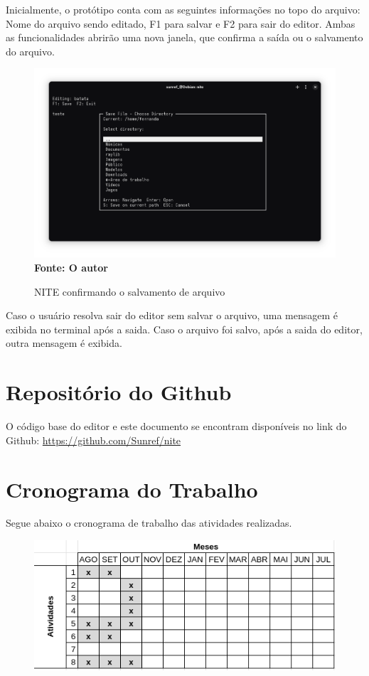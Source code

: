 Inicialmente, o protótipo conta com as seguintes informações no topo do arquivo: Nome do arquivo sendo editado, F1 para salvar e F2 para sair
do editor. Ambas as funcionalidades abrirão uma nova janela, que confirma a saída ou o salvamento do arquivo.

\FloatBarrier
\begin{figure}[!htbp]
    \centering
    \caption{NITE confirmando o salvamento de arquivo}
    \includegraphics[scale=0.3]{imagens/ConfirmSave.png}
    \\\textbf{Fonte: O autor} \label{fig:ConfirmSave}
\end{figure}
\FloatBarrier

Caso o usuário resolva sair do editor sem salvar o arquivo, uma mensagem é exibida no terminal após a saida. Caso o arquivo foi salvo, após a saida
do editor, outra mensagem é exibida.

\section{Repositório do Github}

O código base do editor e este documento se encontram disponíveis no link do Github: \url{https://github.com/Sunref/nite}

\section{Cronograma do Trabalho}

Segue abaixo o cronograma de trabalho das atividades realizadas.

\FloatBarrier
\begin{figure}[!htbp]
	\centering
	\includegraphics[scale=0.4]{imagens/cronograma.png}
\end{figure}
\FloatBarrier

